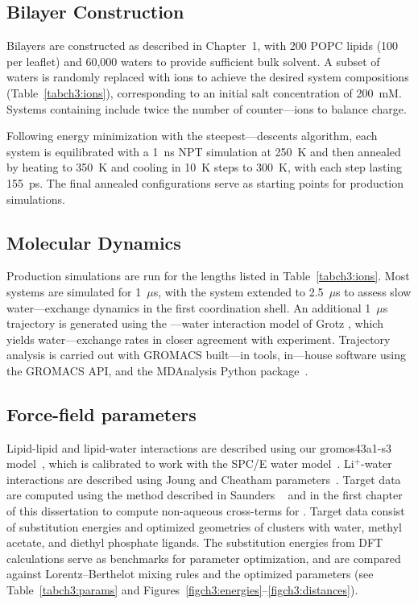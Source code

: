 \subsection{Bilayer Construction}
Bilayers are constructed as described in Chapter~1, with 200 POPC lipids
(100 per leaflet) and 60,000 waters to provide sufficient bulk solvent.
A subset of waters is randomly replaced with ions to achieve the desired
system compositions (Table~\ref{tabch3:ions}), corresponding to an initial
salt concentration of 200~mM. Systems containing \mg{} include twice the
number of counter---ions to balance charge.

Following energy minimization with the steepest---descents algorithm,
each system is equilibrated with a 1~ns NPT simulation at 250~K and then
annealed by heating to 350~K and cooling in 10~K steps to 300~K, with each
step lasting 155~ps. The final annealed configurations serve as starting
points for production simulations.

\subsection{Molecular Dynamics}

Production simulations are run for the lengths listed in
Table~\ref{tabch3:ions}. Most systems are simulated for 1~$\mu$s, with the
\mgmbnbfix{} system extended to 2.5~$\mu$s to assess slow water---exchange
dynamics in the first coordination shell. An additional 1~$\mu$s trajectory
is generated using the \mg---water interaction model of Grotz \etal{}
\cite{grotz:2021:optimized}, which yields water---exchange rates in closer
agreement with experiment. Trajectory analysis is carried out with
GROMACS built---in tools, in---house software using the GROMACS API, and the
MDAnalysis Python package~\cite{gromacsmanual,mdanalysis1,mdanalysis2}.

\subsection{Force-field parameters}

Lipid-lipid and lipid-water interactions are described using our 
gromos43a1-s3 model~\cite{chiu:2009}, 
which is calibrated to work with the SPC/E water model~\cite{spce}. 
Li$^+$-water interactions 
are described using Joung and Cheatham parameters~\cite{joung:2008}. 
Target data are computed using the method described in Saunders \etal~\cite{saunders:2022} and in the first chapter of this dissertation
to compute non-aqueous cross-terms for \li{}. Target data consist of substitution
energies and optimized geometries of \li{} clusters with water, methyl acetate,
and diethyl phosphate ligands. The substitution energies from DFT calculations
serve as benchmarks for parameter optimization, and are compared against
Lorentz–Berthelot mixing rules and the optimized parameters
(see Table~\ref{tabch3:params} and Figures~\ref{figch3:energies}--\ref{figch3:distances}).

